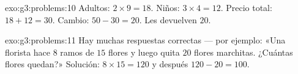 \begin{solution}{exo:g3:problems:10}
Adultos: $2 \times 9 = 18$. Niños: $3 \times 4 = 12$. Precio total:
$18 + 12 = 30$. Cambio: $50 - 30 = 20$. Les devuelven $20$.
\end{solution}

\begin{solution}{exo:g3:problems:11}
Hay muchas respuestas correctas --- por ejemplo: «Una florista hace $8$ ramos
de $15$ flores y luego quita $20$ flores marchitas. ¿Cuántas flores
quedan?» Solución: $8 \times 15 = 120$ y después $120 - 20 = 100$.
\end{solution}
